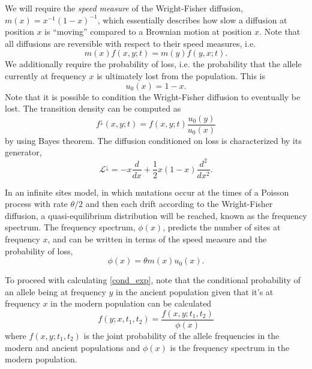 \documentclass[11pt, oneside]{article}   	%
\begin{document}
We will require the \emph{speed measure} of the Wright-Fisher diffusion, $m(x) = x^{-1}(1-x)^{-1}$, which essentially describes how slow a diffusion at position $x$ is ``moving'' compared to a Brownian motion at position $x$. Note that all diffusions are reversible with respect to their speed measures, i.e.
\[
m(x)f(x,y;t) = m(y)f(y,x;t).
\]
We additionally require the probability of loss, i.e. the probability that the allele currently at frequency $x$ is ultimately lost from the population. This is
\[
u_0(x) = 1-x.
\]
Note that it is possible to condition the Wright-Fisher diffusion to eventually be lost. The transition density can be computed as
\[
f^{\downarrow}(x,y;t) = f(x,y;t)\frac{u_0(y)}{u_0(x)}
\]
by using Bayes theorem. The diffusion conditioned on loss is characterized by its generator,
\[
\mathcal{L}^\downarrow = -x\frac{d}{dx} + \frac{1}{2}x(1-x)\frac{d^2}{dx^2}.
\]

In an infinite sites model, in which mutations occur at the times of a Poisson process with rate $\theta/2$ and then each drift according to the Wright-Fisher diffusion, a quasi-equilibrium distribution will be reached, known as the frequency spectrum. The frequency spectrum, $\phi(x)$, predicts the number of sites at frequency $x$, and can be written in terms of the speed measure and the probability of loss,
\[
\phi(x) = \theta m(x)u_0(x).
\]

To proceed with calculating \eqref{cond_exp}, note that the conditional probability of an allele being at frequency $y$ in the ancient population given that it's at frequency $x$ in the modern population can be calculated 
\[
f(y; x, t_1, t_2) = \frac{f(x, y; t_1, t_2)}{\phi(x)}
\]
where $f(x, y; t_1, t_2)$ is the joint probability of the allele frequencies in the modern and ancient populations and $\phi(x)$ is the frequency spectrum in the modern population.
\end{document}
